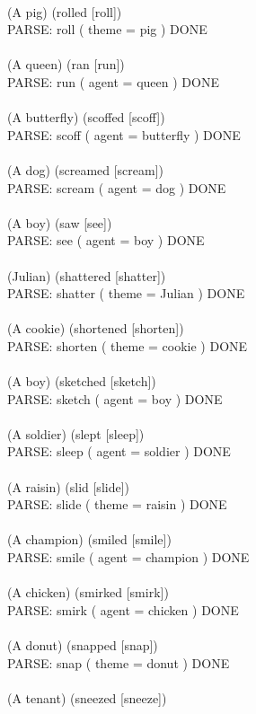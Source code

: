 \documentclass{article} \usepackage{iclr2022_conference,times}
\begin{document}
{ \\
(A pig) (rolled [roll]) \\
PARSE: roll ( theme = pig ) DONE \\
 \\
(A queen) (ran [run]) \\
PARSE: run ( agent = queen ) DONE \\
 \\
(A butterfly) (scoffed [scoff]) \\
PARSE: scoff ( agent = butterfly ) DONE \\
 \\
(A dog) (screamed [scream]) \\
PARSE: scream ( agent = dog ) DONE \\
 \\
(A boy) (saw [see]) \\
PARSE: see ( agent = boy ) DONE \\
 \\
(Julian) (shattered [shatter]) \\
PARSE: shatter ( theme = Julian ) DONE \\
 \\
(A cookie) (shortened [shorten]) \\
PARSE: shorten ( theme = cookie ) DONE \\
 \\
(A boy) (sketched [sketch]) \\
PARSE: sketch ( agent = boy ) DONE \\
 \\
(A soldier) (slept [sleep]) \\
PARSE: sleep ( agent = soldier ) DONE \\
 \\
(A raisin) (slid [slide]) \\
PARSE: slide ( theme = raisin ) DONE \\
 \\
(A champion) (smiled [smile]) \\
PARSE: smile ( agent = champion ) DONE \\
 \\
(A chicken) (smirked [smirk]) \\
PARSE: smirk ( agent = chicken ) DONE \\
 \\
(A donut) (snapped [snap]) \\
PARSE: snap ( theme = donut ) DONE \\
 \\
(A tenant) (sneezed [sneeze]) \\
}
\end{document}
